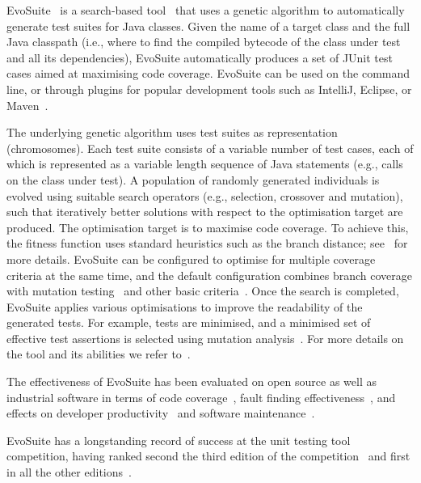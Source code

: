 \documentclass[sigconf,table]{acmart}
\newcommand{\EVOSUITE}{{\sc EvoSuite}\xspace}
\begin{document}
\EVOSUITE~\cite{FrA11c} is a search-based tool~\cite{GoA_TSE12} that
uses a genetic algorithm to automatically generate test suites for
Java classes. Given the name of a target class and the full Java
classpath (i.e., where to find the compiled bytecode of the class
under test and all its dependencies), \EVOSUITE automatically produces
a set of JUnit test cases aimed at maximising code coverage. \EVOSUITE
can be used on the command line, or through plugins for popular
development tools such as IntelliJ, Eclipse, or
Maven~\cite{ICST16_Tool}.

The underlying genetic algorithm uses test suites as representation
(chromosomes). Each test suite consists of a variable number of test
cases, each of which is represented as a variable length sequence of
Java statements (e.g., calls on the class under test). A population of
randomly generated individuals is evolved using suitable search
operators (e.g., selection, crossover and mutation), such that
iteratively better solutions with respect to the optimisation target
are produced. The optimisation target is to maximise code coverage. To
achieve this, the fitness function uses standard heuristics such as
the branch distance; see~\cite{GoA_TSE12} for more details. \EVOSUITE
can be configured to optimise for multiple coverage criteria at the
same time, and the default configuration combines branch coverage with
mutation testing~\cite{emse14_mutation} and other basic
criteria~\cite{rojas2015combining}. Once the search is completed,
\EVOSUITE applies various optimisations to improve the readability of
the generated tests. For example, tests are minimised, and a
minimised set of effective test assertions is selected using mutation
analysis~\cite{10.1109/TSE.2011.93}. For more details on the tool and
its abilities we refer to~\cite{FrA11c,FrA13a}.


The effectiveness of \EVOSUITE has been evaluated on open source as
well as industrial software in terms of code
coverage~\cite{fraser2014large,emse_archive}, fault finding
effectiveness~\cite{shamshiri2015automatically,moein2017}, and effects
on developer
productivity~\cite{TOSEM_userstudy,ISSTA15_Study} and software
maintenance~\cite{ICST2018_Maintenance}.

\EVOSUITE has a longstanding record of success at the unit testing
tool competition, having ranked second the third edition of the
competition~\cite{evosuiteAtSbst2015} and first in all the other
editions~\cite{evosuiteAtSbst2013,evosuiteAtFittest2013,evosuiteAtSbst2016,evosuiteAtSbst2017}.
\end{document}
